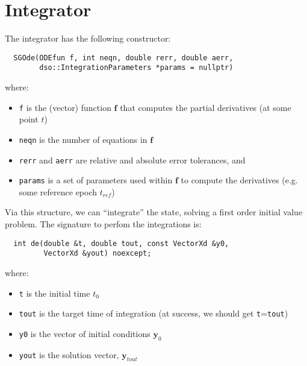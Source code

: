 \section{Integrator}
\label{sec:Integrator}

The integrator has the following constructor:
\begin{lstlisting}
  SGOde(ODEfun f, int neqn, double rerr, double aerr,                         
        dso::IntegrationParameters *params = nullptr)
\end{lstlisting}

where:
\begin{itemize}
    \item \label{it:odefun} \texttt{f} is the (vector) function $\bm{f}$ that 
        computes the partial derivatives (at some point $t$)
    \item \texttt{neqn} is the number of equations in $\bm{f}$
    \item \texttt{rerr} and \texttt{aerr} are relative and absolute error 
        tolerances, and
    \item \texttt{params} is a set of parameters used within $\bm{f}$ to 
        compute the derivatives (e.g. some reference epoch $t_{ref}$)
\end{itemize}

Via this structure, we can ``integrate'' the state, solving a first order 
initial value problem. The signature to perfom the integrations is:
\begin{lstlisting}
  int de(double &t, double tout, const VectorXd &y0,                     
         VectorXd &yout) noexcept;
\end{lstlisting}
where:
\begin{itemize}
    \item \texttt{t} is the initial time $t_0$
    \item \texttt{tout} is the target time of integration (at success, we 
        should get \texttt{t}=\texttt{tout})
    \item \texttt{y0} is the vector of initial conditions $\bm{y}_0$
    \item \texttt{yout} is the solution vector, $\bm{y}_{tout}$
\end{itemize}

